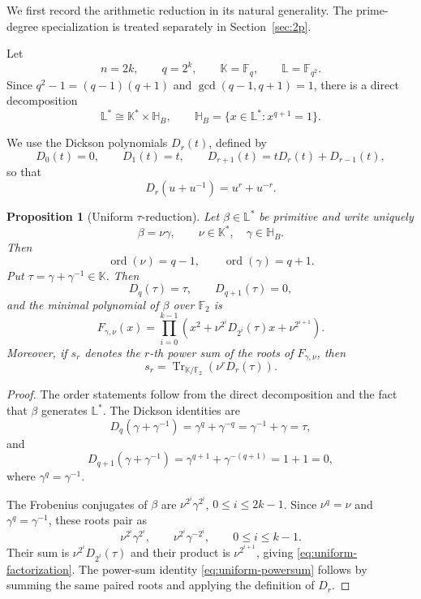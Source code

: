 \documentclass[11pt]{article}
\newtheorem{proposition}[theorem]{Proposition}
\theoremstyle{definition}
\theoremstyle{remark}
\begin{document}
We first record the arithmetic reduction in its natural generality. The prime-degree specialization is treated separately in Section~\ref{sec:2p}.

Let
\[
n=2k,\qquad q=2^k,\qquad
\mathbb K=\mathbb F_q,\qquad \mathbb L=\mathbb F_{q^2}.
\]
Since \(q^2-1=(q-1)(q+1)\) and \(\gcd(q-1,q+1)=1\), there is a direct decomposition
\[
\mathbb L^*\cong \mathbb K^*\times \mathbb H_B,
\qquad
\mathbb H_B=\{x\in\mathbb L^*:x^{q+1}=1\}.
\]

We use the Dickson polynomials \(D_r(t)\), defined by
\[
D_0(t)=0,\qquad D_1(t)=t,\qquad
D_{r+1}(t)=tD_r(t)+D_{r-1}(t),
\]
so that
\[
D_r(u+u^{-1})=u^r+u^{-r}.
\]

\begin{proposition}[Uniform \(\tau\)-reduction]\label{prop:uniform-tau}
Let \(\beta\in\mathbb L^*\) be primitive and write uniquely
\[
\beta=\nu\gamma,\qquad \nu\in\mathbb K^*,\quad \gamma\in\mathbb H_B.
\]
Then
\[
\operatorname{ord}(\nu)=q-1,\qquad \operatorname{ord}(\gamma)=q+1.
\]
Put \(\tau=\gamma+\gamma^{-1}\in\mathbb K\). Then
\[
D_q(\tau)=\tau,\qquad D_{q+1}(\tau)=0,
\]
and the minimal polynomial of \(\beta\) over \(\mathbb F_2\) is
\begin{equation}\label{eq:uniform-factorization}
F_{\gamma,\nu}(x)
=
\prod_{i=0}^{k-1}
\left(x^2+\nu^{2^i}D_{2^i}(\tau)x+\nu^{2^{i+1}}\right).
\end{equation}
Moreover, if \(s_r\) denotes the \(r\)-th power sum of the roots of \(F_{\gamma,\nu}\), then
\begin{equation}\label{eq:uniform-powersum}
s_r
=
\operatorname{Tr}_{\mathbb K/\mathbb F_2}
\left(\nu^rD_r(\tau)\right).
\end{equation}
\end{proposition}

\begin{proof}
The order statements follow from the direct decomposition and the fact that \(\beta\) generates \(\mathbb L^*\). The Dickson identities are
\[
D_q(\gamma+\gamma^{-1})
=\gamma^q+\gamma^{-q}
=\gamma^{-1}+\gamma
=\tau,
\]
and
\[
D_{q+1}(\gamma+\gamma^{-1})
=\gamma^{q+1}+\gamma^{-(q+1)}
=1+1=0,
\]
where \(\gamma^q=\gamma^{-1}\).

The Frobenius conjugates of \(\beta\) are \(\nu^{2^i}\gamma^{2^i}\), \(0\le i\le 2k-1\). Since \(\nu^q=\nu\) and \(\gamma^q=\gamma^{-1}\), these roots pair as
\[
\nu^{2^i}\gamma^{2^i},\qquad \nu^{2^i}\gamma^{-2^i},
\qquad 0\le i\le k-1.
\]
Their sum is \(\nu^{2^i}D_{2^i}(\tau)\) and their product is \(\nu^{2^{i+1}}\), giving \eqref{eq:uniform-factorization}. The power-sum identity \eqref{eq:uniform-powersum} follows by summing the same paired roots and applying the definition of \(D_r\).
\end{proof}
\end{document}
